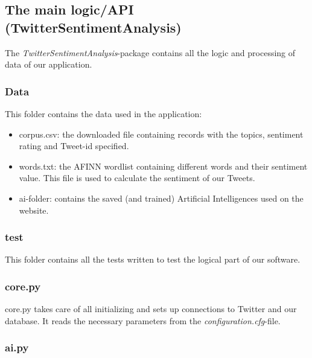 \documentclass[10pt]{IEEEtran}
\begin{document}
\subsection{The main logic/API (TwitterSentimentAnalysis)}

The \emph{TwitterSentimentAnalysis}-package contains all the logic and processing of data of our application.

\subsubsection{Data}

This folder contains the data used in the application: 
\begin{itemize}
	\item corpus.csv: the downloaded file containing records with the topics, sentiment rating and Tweet-id specified.
	\item words.txt: the AFINN wordlist containing different words and their sentiment value. This file is used to calculate the sentiment of our Tweets.
	\item ai-folder: contains the saved (and trained) Artificial Intelligences used on the website.
\end{itemize}

\subsubsection{test}

This folder contains all the tests written to test the logical part of our software.

\subsubsection{core.py}

core.py takes care of all initializing and sets up connections to Twitter and our database. It reads the necessary parameters from the \emph{configuration.cfg}-file.

\subsubsection{ai.py}
\end{document}

